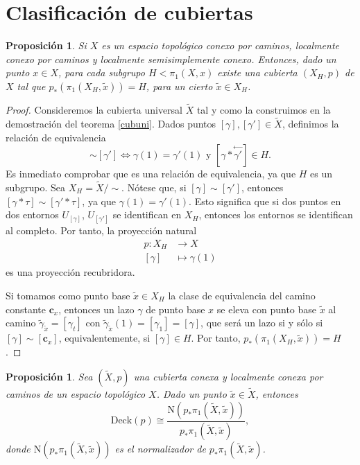 \documentclass[12pt,a4paper]{book}
\newtheorem{prop}[thm]{Proposición}
\theoremstyle{definition} \newtheorem{defn}[thm]{Definición}
\theoremstyle{definition} \newtheorem{ejemplo}[thm]{Ejemplo}
\theoremstyle{definition} \newtheorem{ejercicio}[thm]{Ejercicio}
\theoremstyle{remark} \newtheorem*{obs}{Observación}
\def\cc{\mathbf{c}}
\def\gf{\pi_1}
\def\XX{\tilde{X}}
\def\xx{\tilde{x}}
\def\DD{\mathrm{Deck}}
\def\NR{\mathrm{N}}
\newcommand\cev[1]{\overset{\leftarrow}{#1}}
\begin{document}
\section{Clasificación de cubiertas}
\begin{prop}\label{cubsubg}
  Si $X$ es un espacio topológico conexo por caminos, localmente conexo por caminos y localmente semisimplemente conexo. Entonces, dado un punto $x\in X$, para cada subgrupo $H<\gf(X,x)$ existe una cubierta $(X_H,p)$ de $X$ tal que $p_*(\gf(X_H,\xx))=H$, para un cierto  $\xx \in X_H$.
\end{prop}
\begin{proof}
  Consideremos la cubierta universal $\XX$ tal y como la construimos en la demostración del teorema \ref{cubuni}. Dados puntos $[\gamma],[\gamma']\in \XX$, definimos la relación de equivalencia
  \begin{equation*}
    [\gamma]\sim[\gamma'] \Leftrightarrow \gamma(1)=\gamma'(1) \text{ y } [\gamma*\cev{\gamma'}]\in H.
  \end{equation*}
  Es inmediato comprobar que es una relación de equivalencia, ya que $H$ es un subgrupo. Sea $X_H=\XX/\sim$. Nótese que, si $[\gamma]\sim [\gamma']$, entonces $[\gamma*\tau]\sim [\gamma'*\tau]$, ya que $\gamma(1)=\gamma'(1)$. Esto significa que si dos puntos en dos entornos $U_{[\gamma]}$, $U_{[\gamma']}$ se identifican en $X_H$, entonces los entornos se identifican al completo. Por tanto, la proyección natural 
  \begin{align*}
    p :X_H&\longrightarrow X\\ 
    [\gamma] &\longmapsto \gamma(1) 
    \end{align*}
    es una proyección recubridora.

    Si tomamos como punto base $\xx\in X_H$ la clase de equivalencia del camino constante $\cc_{x}$, entonces un lazo $\gamma$ de punto base $x$ se eleva con punto base $\xx$ al camino $\tilde{\gamma}_{\xx}=[\gamma_t]$ con $\tilde{\gamma}_{\xx}(1)=[\gamma_1]=[\gamma]$, que será un lazo si y sólo si $[\gamma]\sim[\cc_x]$, equivalentemente, si $[\gamma]\in H$. Por tanto, $p_*(\gf(X_H,\xx))=H$.
\end{proof}
\begin{prop}
  Sea $(\XX,p)$ una cubierta conexa y localmente conexa por caminos de un espacio topológico $X$. Dado un punto $\xx\in \XX$, entonces
  \begin{equation*}
    \DD(p)\cong \frac{\NR(p_*\gf(\XX,\xx))}{p_*\gf(\XX,\xx)},
  \end{equation*}
  donde $\NR(p_*\gf(\XX,\xx))$ es el normalizador de $p_*\gf(\XX,\xx)$.
\end{prop}
\end{document}
